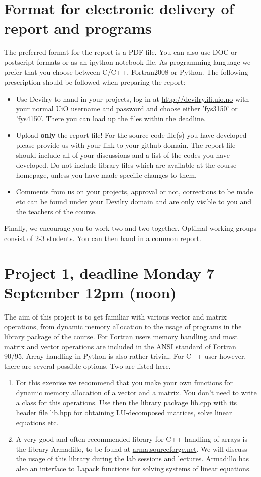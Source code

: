 \documentclass[11pt,a4wide]{article}
\begin{document}
\section*{Format for electronic delivery of report and programs}
%
The preferred format for the report is a PDF file. You can also
use DOC or postscript formats or as an ipython notebook file. 
As programming language we prefer that you choose between C/C++, Fortran2008 or Python.
The following prescription should be followed when preparing the report:
\begin{itemize}
\item Use Devilry to hand in your projects, log in  at 
\url{ http://devilry.ifi.uio.no} with your normal UiO username and password
and choose either 'fys3150' or 'fys4150'.
There you can load up the files within the deadline.
\item Upload {\bf only} the report file!  For the source code file(s) you have developed please provide us with your link to your github domain. 
The report file should include all of your discussions and a list of the codes you have developed. 
Do not include library files which are available at the course homepage, unless you have
made specific changes to them.
\item Comments  from us on your projects, approval or not, corrections to be made 
etc can be found under
your Devilry domain and are only visible to you and the teachers of the course.

\end{itemize}

Finally, 
we encourage you to work two and two together. Optimal working groups consist of 
2-3 students. You can then hand in a common report. 

\section*{Project 1, deadline Monday 7 September 12pm (noon)}

The aim of this project is to get familiar with various vector and matrix operations,
from dynamic memory allocation to the usage of programs in the library
package of the course. 
For Fortran users memory handling and most matrix and vector operations
are included in the ANSI standard of Fortran 90/95. Array handling in Python is also rather trivial. For C++ user however,
there are several possible options. Two are listed here.
\begin{enumerate}
\item For this exercise we recommend that you make your own functions for dynamic memory allocation of a 
vector and a matrix. You don't need to write a class for this operations. 
Use then the 
library package lib.cpp with its header file 
lib.hpp for obtaining LU-decomposed matrices, solve linear equations
etc.
\item A very good and often recommended library for C++ handling of arrays is the library Armadillo, to be found at \url{arma.sourceforge.net}.  We will discuss the usage of this library during the lab sessions and lectures. Armadillo has also an interface to Lapack functions for solving systems of linear equations.
\end{enumerate}
\end{document}
